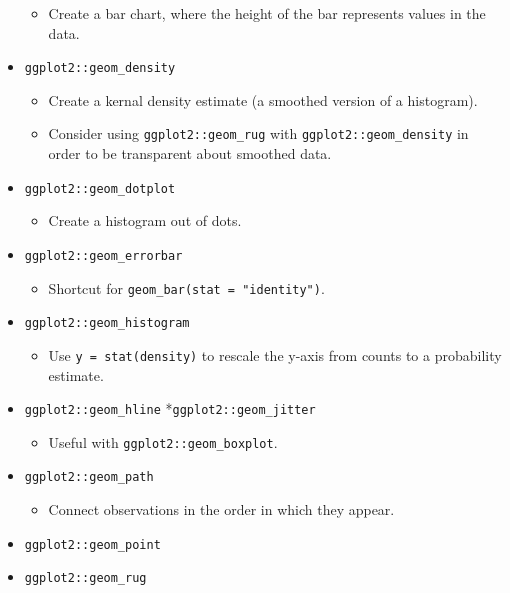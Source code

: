 \documentclass[
]{book}
\providecommand{\tightlist}{%
  \setlength{\itemsep}{0pt}\setlength{\parskip}{0pt}}
\begin{document}
\begin{itemize}
  \begin{itemize}
  \tightlist
  \item
    Create a bar chart, where the height of the bar represents values in the data.
  \end{itemize}
\item
  \texttt{ggplot2::geom\_density}

  \begin{itemize}
  \tightlist
  \item
    Create a kernal density estimate (a smoothed version of a histogram).
  \item
    Consider using \texttt{ggplot2::geom\_rug} with \texttt{ggplot2::geom\_density} in order to be transparent about smoothed data.
  \end{itemize}
\item
  \texttt{ggplot2::geom\_dotplot}

  \begin{itemize}
  \tightlist
  \item
    Create a histogram out of dots.
  \end{itemize}
\item
  \texttt{ggplot2::geom\_errorbar}

  \begin{itemize}
  \tightlist
  \item
    Shortcut for \texttt{geom\_bar(stat\ =\ "identity")}.
  \end{itemize}
\item
  \texttt{ggplot2::geom\_histogram}

  \begin{itemize}
  \tightlist
  \item
    Use \texttt{y\ =\ stat(density)} to rescale the y-axis from counts to a probability estimate.
  \end{itemize}
\item
  \texttt{ggplot2::geom\_hline}
  *\texttt{ggplot2::geom\_jitter}

  \begin{itemize}
  \tightlist
  \item
    Useful with \texttt{ggplot2::geom\_boxplot}.
  \end{itemize}
\item
  \texttt{ggplot2::geom\_path}

  \begin{itemize}
  \tightlist
  \item
    Connect observations in the order in which they appear.
  \end{itemize}
\item
  \texttt{ggplot2::geom\_point}
\item
  \texttt{ggplot2::geom\_rug}


\end{itemize}
\end{document}
